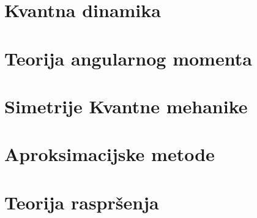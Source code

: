 \documentclass{article}
\numberwithin{equation}{section}
\begin{document}
\section{Kvantna dinamika}

\section{Teorija angularnog momenta}

\section{Simetrije Kvantne mehanike}

\section{Aproksimacijske metode}

\section{Teorija raspršenja}
\end{document}
